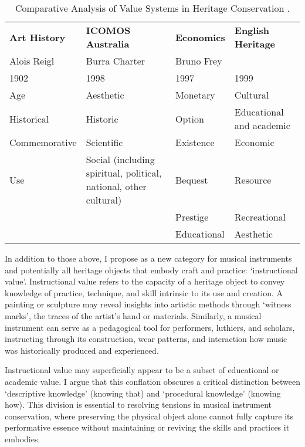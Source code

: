 \begin{table}[h]
    \centering
    \begin{adjustbox}{width=\textwidth}
        \begin{tabular}{llll}
            \toprule
            \textbf{Art History} & \textbf{ICOMOS Australia} & \textbf{Economics} & \textbf{English Heritage} \\
            Alois Reigl & Burra Charter & Bruno Frey &  \\ 
            1902 & 1998 & 1997 & 1999 \\ \hline
            Age & Aesthetic & Monetary & Cultural \\ 
            Historical & Historic & Option & Educational and academic \\ 
            Commemorative & Scientific & Existence & Economic \\ 
            Use & Social (including spiritual, political, national, other cultural) & Bequest & Resource \\ 
            & & Prestige & Recreational \\
            & & Educational & Aesthetic \\
            \bottomrule
        \end{tabular}
    \end{adjustbox}
    \caption{Comparative Analysis of Value Systems in Heritage Conservation \cite{avrami_values_2000}.}
    \label{tab:values_comparison}
\end{table}

In addition to those above, I propose as a new category for musical instruments and potentially all heritage objects that embody craft and practice: `instructional value'. Instructional value refers to the capacity of a heritage object to convey knowledge of practice, technique, and skill intrinsic to its use and creation. A painting or sculpture may reveal insights into artistic methods through `witness marks', the traces of the artist’s hand or materials. Similarly, a musical instrument can serve as a pedagogical tool for performers, luthiers, and scholars, instructing through its construction, wear patterns, and interaction how music was historically produced and experienced.

Instructional value may superficially appear to be a subset of educational or academic value. I argue that this conflation obscures a critical distinction between `descriptive knowledge' (knowing that) and `procedural knowledge' (knowing how). This division is essential to resolving tensions in musical instrument conservation, where preserving the physical object alone cannot fully capture its performative essence without maintaining or reviving the skills and practices it embodies.

